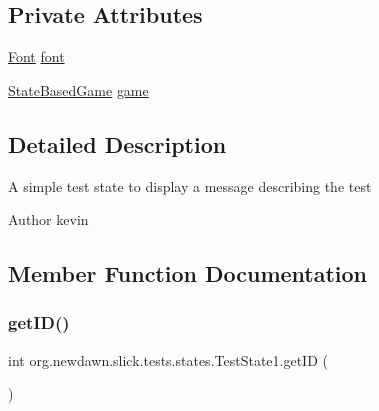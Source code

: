 \subsection*{Private Attributes}
\begin{DoxyCompactItemize}
\item 
\mbox{\hyperlink{interfaceorg_1_1newdawn_1_1slick_1_1_font}{Font}} \mbox{\hyperlink{classorg_1_1newdawn_1_1slick_1_1tests_1_1states_1_1_test_state1_aa468e72bb425e9f217e3580c6bfae716}{font}}
\item 
\mbox{\hyperlink{classorg_1_1newdawn_1_1slick_1_1state_1_1_state_based_game}{State\+Based\+Game}} \mbox{\hyperlink{classorg_1_1newdawn_1_1slick_1_1tests_1_1states_1_1_test_state1_a57818ecf2b21da6af28aed24c4412fb1}{game}}
\end{DoxyCompactItemize}


\subsection{Detailed Description}
A simple test state to display a message describing the test

\begin{DoxyAuthor}{Author}
kevin 
\end{DoxyAuthor}


\subsection{Member Function Documentation}
\mbox{\label{classorg_1_1newdawn_1_1slick_1_1tests_1_1states_1_1_test_state1_a441e5a49fc651b943a076d76dafa360c}} 
\subsubsection{\texorpdfstring{get\+I\+D()}{getID()}}
{\footnotesize\ttfamily int org.\+newdawn.\+slick.\+tests.\+states.\+Test\+State1.\+get\+ID (\begin{DoxyParamCaption}{ }\end{DoxyParamCaption})\hspace{0.3cm}{\ttfamily [inline]}}

